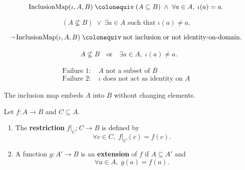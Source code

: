 \begin{remark*}
\[
\operatorname{InclusionMap}(\iota,A,B)
\;\colonequiv\;
(A \subseteq B)
\;\land\;
\forall a \in A,\; \iota(a) = a.
\]
\end{remark*}

\begin{remark*}
\[
(A \nsubseteq B)
\;\lor\;
\exists a \in A \text{ such that } \iota(a) \ne a.
\]
\end{remark*}

\begin{remark*}
\[
\neg \operatorname{InclusionMap}(\iota,A,B)
\;\colonequiv\;
\text{not inclusion or not identity-on-domain}.
\]
\end{remark*}

\begin{remark*}
\[
\begin{aligned}
&A \nsubseteq B
\quad\text{or}\quad
\exists a \in A,\; \iota(a) \ne a.
\end{aligned}
\]
\end{remark*}

\begin{remark*}
\[
\begin{aligned}
\text{Failure 1: } &A \text{ not a subset of } B \\
\text{Failure 2: } &\iota \text{ does not act as identity on } A
\end{aligned}
\]
\end{remark*}

\begin{remark*}[Interpretation]
The inclusion map embeds $A$ into $B$ without changing elements.
\end{remark*}


\begin{tcolorbox}[title={Definition --- Restriction / Extension}]
\begin{definition}
\label{def:alg-restriction}
Let $f : A \to B$ and $C \subseteq A$.
\begin{enumerate}[label=(\roman*)]
  \item The \textbf{restriction} $f|_C : C \to B$ is defined by
        \[
        \forall c \in C,\; f|_C(c) = f(c).
        \]
  \item A function $g : A' \to B$ is an \textbf{extension} of $f$ if
        $A \subseteq A'$ and
        \[
        \forall a \in A,\; g(a) = f(a).
        \]
\end{enumerate}
\end{definition}
\end{tcolorbox}

